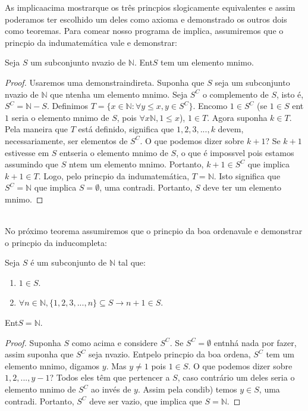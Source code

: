 As implica\coes acima mostrar\ao que os tr\^es princ\ih pios s\ao logicamente equivalentes e assim poder\ih amos ter escolhido um deles como axioma e demonstrado os outros dois como teoremas. Para come\cc ar nosso programa de implica\cois, assumiremos que o princ\ih pio da indu\cao matem\'atica vale e demonstrar:
\begin{teob}\label{indteo1}
Seja $S$ um subconjunto n\ao vazio de $\mathbb{N}$. Ent\ao $S$ tem um elemento m\ih nimo.
\end{teob}
\begin{proof}
Usaremos uma demonstra\cao indireta. Suponha que $S$ seja um subconjunto n\ao vazio de $\mathbb{N}$ que n\ao tenha um elemento m\ih nimo. Seja $S^C$ o complemento de $S$, isto \'e, $S^C=\mathbb{N}-S$. Definimos $T=\{x\in\mathbb{N}: \forall y\leq x, y\in S^C\}$. En\tao como $1\in S^C$ (se $1\in S$ ent\ao $1$ seria o elemento m\ih nimo de $S$, pois $\forall x\mathbb{N}, 1\leq x$), $1\in T$. Agora suponha $k\in T$. Pela maneira que $T$ est\'a definido, significa que $1,2,3,...,k$ devem, necessariamente, ser elementos de $S^C$. O que podemos dizer sobre $k+1$? Se $k+1$ estivesse em $S$ ent\ao seria o elemento m\ih nimo de $S$, o que \'e imposs\ih vel pois estamos assumindo que $S$ n\ao tem um elemento m\ih nimo. Portanto, $k+1\in S^C$ que implica $k+1\in T$. Logo, pelo princ\ih pio da indu\cao matem\'atica, $T=\mathbb{N}$. Isto significa que $S^C=\mathbb{N}$ que implica $S=\emptyset$, uma contradi\caoi. Portanto, $S$ deve ter um elemento m\ih nimo. 
\end{proof}
\\

No pr\'oximo teorema assumiremos que o princ\ih pio da boa ordena\cao vale e demonstrar o princ\ih pio da indu\cao completa:
\begin{teob}\label{indteo2}
Seja $S$ \'e um subconjunto de $\mathbb{N}$ tal que:
\begin{enumerate}[{\bf a)}]
\item $1\in S$.
\item $\forall n\in \mathbb{N}, \{1,2,3,...,n\}\subseteq S \rightarrow n+1\in S$. 
\end{enumerate}
Ent\ao $S=\mathbb{N}$. 
\\
\end{teob}
\begin{proof}
Suponha $S$ como acima e considere $S^C$. Se $S^C=\emptyset$ ent\ao n\ao h\'a nada por fazer, assim suponha que $S^C$ seja n\ao vazio. Ent\ao pelo princ\ih pio da boa ordena\caoi, $S^C$ tem um elemento m\ih nimo, digamos $y$. Mas $y\neq 1$ pois $1\in S$. O que podemos dizer sobre $1,2,...,y-1$? Todos eles t\^em que pertencer a $S$, caso contr\'ario um deles seria o elemento m\ih nimo de $S^C$ ao inv\'es de $y$. Assim pela condi\cao b) temos $y\in S$, uma contradi\caoi. Portanto, $S^C$ deve ser vazio, que implica que $S=\mathbb{N}$.
\end{proof}
\\

